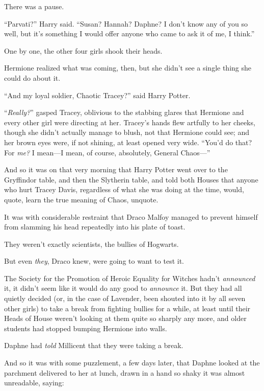 There was a pause.

“Parvati?” Harry said. “Susan? Hannah? Daphne? I don’t know any of you so well, but it’s something I would offer anyone who came to ask it of me, I think.”

One by one, the other four girls shook their heads.

Hermione realized what was coming, then, but she didn’t see a single thing she could do about it.

“And my loyal soldier, Chaotic Tracey?” said Harry Potter.

“\emph{Really?}” gasped Tracey, oblivious to the stabbing glares that Hermione and every other girl were directing at her. Tracey’s hands flew artfully to her cheeks, though she didn’t actually manage to blush, not that Hermione could see; and her brown eyes were, if not shining, at least opened very wide. “You’d do that? For \emph{me?} I mean—I mean, of course, absolutely, General Chaos—”

\later

And so it was on that very morning that Harry Potter went over to the Gryffindor table, and then the Slytherin table, and told both Houses that anyone who hurt Tracey Davis, regardless of what she was doing at the time, would, quote, learn the true meaning of Chaos, unquote.

It was with considerable restraint that Draco Malfoy managed to prevent himself from slamming his head repeatedly into his plate of toast.

They weren’t exactly scientists, the bullies of Hogwarts.

But even \emph{they}, Draco knew, were going to want to test it.

\later

The Society for the Promotion of Heroic Equality for Witches hadn’t \emph{announced} it, it didn’t seem like it would do any good to \emph{announce} it. But they had all quietly decided (or, in the case of Lavender, been shouted into it by all seven other girls) to take a break from fighting bullies for a while, at least until their Heads of House weren’t looking at them quite so sharply any more, and older students had stopped bumping Hermione into walls.

Daphne had \emph{told} Millicent that they were taking a break.

And so it was with some puzzlement, a few days later, that Daphne looked at the parchment delivered to her at lunch, drawn in a hand so shaky it was almost unreadable, saying:

